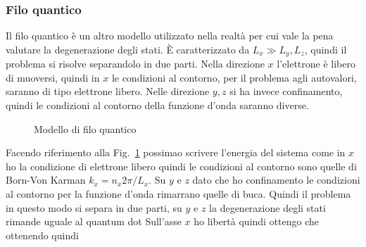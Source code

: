 \documentclass[a4paper,12pt]{article}
\begin{document}
\subsubsection{Filo quantico}
Il filo quantico è un altro modello utilizzato nella realtà per cui vale la pena valutare la degenerazione degli stati. \`E caratterizzato da $L_x \gg L_y,L_z$, quindi il problema si risolve  separandolo in due parti. Nella direzione $x$ l'elettrone è libero di muoversi, quindi in $x$ le condizioni al contorno, per il problema agli autovalori, saranno di tipo elettrone libero. Nelle direzione $y,z$ si ha invece confinamento, quindi le condizioni al contorno della funzione d'onda saranno diverse.
\begin{figure}
	\centering
	\caption{Modello di filo quantico}
	\label{FILO:Q}
\end{figure}
Facendo riferimento alla Fig.~\ref{FILO:Q} possimao scrivere l'energia del sistema come
in $x$ ho la condizione di elettrone libero quindi le condizioni al contorno sono quelle di Born-Von Karman $k_x = n_x 2\pi/L_x$. Su $y$ e $z$ dato che ho confinamento le condizioni al contorno per la funzione d'onda rimarrano quelle di buca. Quindi il problema in questo modo si separa in due parti, su $y$ e $z$ la degenerazione degli stati rimande uguale al quantum dot
Sull'asse $x$ ho libertà quindi ottengo che
ottenendo quindi
\end{document}
